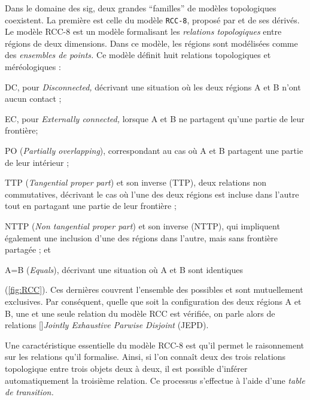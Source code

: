 Dans le domaine des \ac{sig}, deux grandes \enquote{familles} de
modèles topologiques coexistent. La première est celle du modèle
\texttt{RCC-8}, proposé par \textcite{Randell1992} et de ses
dérivés. Le modèle RCC-8 est un modèle formalisant les \emph{relations
  topologiques} entre régions de deux dimensions. Dans ce modèle, les
régions sont modélisées comme des \emph{ensembles de points.} Ce
modèle définit huit relations topologiques et méréologiques :
%
\begin{enumerate*}[label=(\alph*)]
\item DC, pour \emph{Disconnected,} décrivant une situation où les
  deux régions \textcolor{RdBu-9-1}{A} et \textcolor{RdBu-9-9}{B} n'ont
  aucun contact ;
\item EC, pour \emph{Externally connected,} lorsque
  \textcolor{RdBu-9-1}{A} et \textcolor{RdBu-9-9}{B} ne partagent
  qu'une partie de leur frontière;
\item PO (\emph{Partially overlapping}), correspondant au cas où
  \textcolor{RdBu-9-1}{A} et \textcolor{RdBu-9-9}{B} partagent une
  partie de leur intérieur ;
\item TTP (\emph{Tangential proper part}) et son inverse (TTP),
  deux relations non commutatives, décrivant le cas où l'une des deux
  régions est incluse dans l'autre tout en partagant une partie de
  leur frontière ;
\item NTTP (\emph{Non tangential proper part}) et son inverse
  (NTTP), qui impliquent également une inclusion d'une des
  régions dans l'autre, mais sans frontière partagée ; et
\item A=B (\emph{Equals}), décrivant une situation où
  \textcolor{RdBu-9-1}{A} et \textcolor{RdBu-9-9}{B} sont identiques
\end{enumerate*}
%
(\autoref{fig:RCC}).
%
Ces dernières couvrent l'ensemble des possibles et sont mutuellement
exclusives. Par conséquent, quelle que soit la configuration des deux
régions \textcolor{RdBu-9-1}{A} et \textcolor{RdBu-9-9}{B}, une et une
seule relation du modèle RCC est vérifiée, on parle alors de relations
[{\cite{Duchene2019}}]{\emph{Jointly
    Exhaustive Parwise Disjoint}} (JEPD).

Une caractéristique essentielle du modèle RCC-8 est qu'il permet le
raisonnement sur les relations qu'il formalise. Ainsi, si l'on connaît
deux des trois relations topologique entre trois objets deux à deux,
il est possible d'inférer automatiquement la troisième relation. Ce
processus s’effectue à l'aide d'une \emph{table de transition.}


